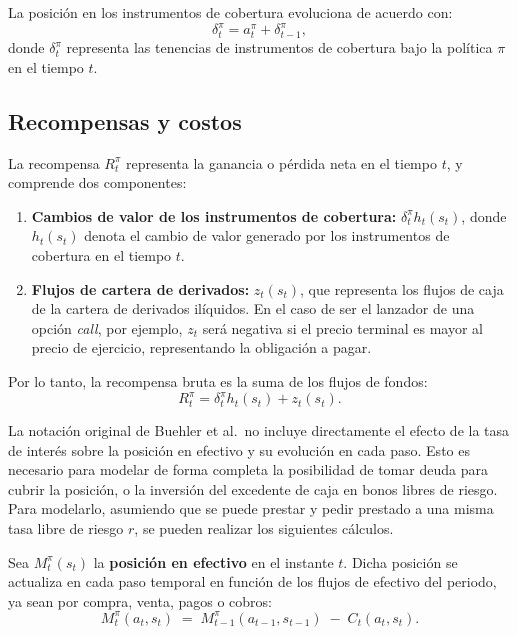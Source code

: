 \documentclass[11pt,a4paper,spanish]{article}
\numberwithin{equation}{section} %
\begin{document}
La posición en los instrumentos de cobertura evoluciona de acuerdo con:
\begin{equation}
\delta_t^\pi = a_t^\pi + \delta_{t-1}^\pi,
\end{equation}
donde \( \delta_t^\pi \) representa las tenencias de instrumentos de cobertura bajo la política \( \pi \) en el tiempo \( t \).

\subsection{Recompensas y costos}

La recompensa \( R_t^\pi \) representa la ganancia o pérdida neta en el tiempo \( t \), y comprende dos componentes:
\begin{enumerate}
    \item \textbf{Cambios de valor de los instrumentos de cobertura:} \( \delta_t^\pi h_t(s_t) \), donde \( h_t(s_t) \) denota el cambio de valor generado por los instrumentos de cobertura en el tiempo \( t \).
    \item \textbf{Flujos de cartera de derivados:} \( z_t(s_t) \), que representa los flujos de caja de la cartera de derivados ilíquidos. En el caso de ser el lanzador de una opción \textit{call}, por ejemplo, \(z_t\) será negativa si el precio terminal es mayor al precio de ejercicio, representando la obligación a pagar.
\end{enumerate}

Por lo tanto, la recompensa bruta es la suma de los flujos de fondos:
\begin{equation}
R_t^\pi = \delta_t^\pi h_t(s_t) + z_t(s_t).
\end{equation}

La notación original de Buehler et al.\ no incluye directamente el efecto de la tasa de interés sobre la posición en efectivo y su evolución en cada paso. Esto es necesario para modelar de forma completa la posibilidad de tomar deuda para cubrir la posición, o la inversión del excedente de caja en bonos libres de riesgo. Para modelarlo, asumiendo que se puede prestar y pedir prestado a una misma tasa libre de riesgo \(r\), se pueden realizar los siguientes cálculos.

Sea \(M_t^\pi(s_t)\) la \textbf{posición en efectivo} en el instante \(t\). Dicha posición 
se actualiza en cada paso temporal en función de los flujos de efectivo del periodo, ya sean por compra, venta, pagos o cobros:
\begin{equation}
M_t^\pi(a_t, s_t) \;=\; M_{t-1}^\pi(a_{t-1}, s_{t-1}) \;-\; C_t(a_{t}, s_{t}).
\end{equation}
\end{document}
